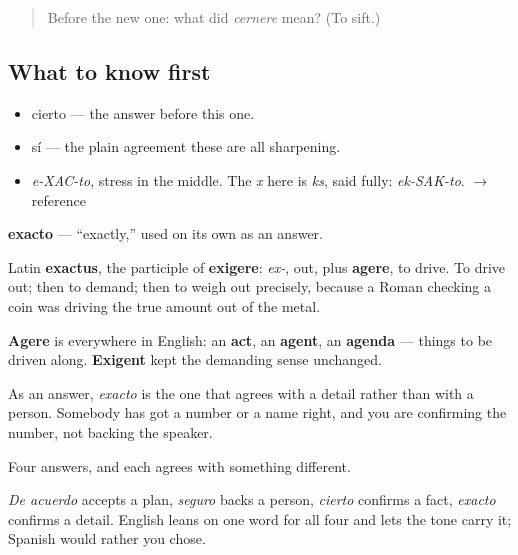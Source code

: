 \label{lesson:ES-C284-exacto}



\begin{quote}
Before the new one: what did \emph{cernere} mean? (To sift.)
\end{quote}

\subsection*{What to know first}
\begin{itemize}
\raggedright
  \item cierto — the answer before this one.
  \item sí — the plain agreement these are all sharpening.
\end{itemize}

\begin{sounds}
\begin{itemize}
\raggedright
  \item \emph{e-XAC-to}, stress in the middle. The \emph{x} here is \emph{ks}, said fully: \emph{ek-SAK-to}. $\to$ reference
\end{itemize}
\end{sounds}

\begin{cousinweb}
\textbf{exacto} — \textquotedblleft{}exactly,\textquotedblright{} used on its own as an answer.

Latin \textbf{exactus}, the participle of \textbf{exigere}: \emph{ex-}, out, plus \textbf{agere}, to drive. To drive out; then to demand; then to weigh out precisely, because a Roman checking a coin was driving the true amount out of the metal.

\textbf{Agere} is everywhere in English: an \textbf{act}, an \textbf{agent}, an \textbf{agenda} — things to be driven along. \textbf{Exigent} kept the demanding sense unchanged.

As an answer, \emph{exacto} is the one that agrees with a detail rather than with a person. Somebody has got a number or a name right, and you are confirming the number, not backing the speaker.
\end{cousinweb}

\begin{grammarlens}[title={What you've built}]
Four answers, and each agrees with something different.

\emph{De acuerdo} accepts a plan, \emph{seguro} backs a person, \emph{cierto} confirms a fact, \emph{exacto} confirms a detail. English leans on one word for all four and lets the tone carry it; Spanish would rather you chose.
\end{grammarlens}

